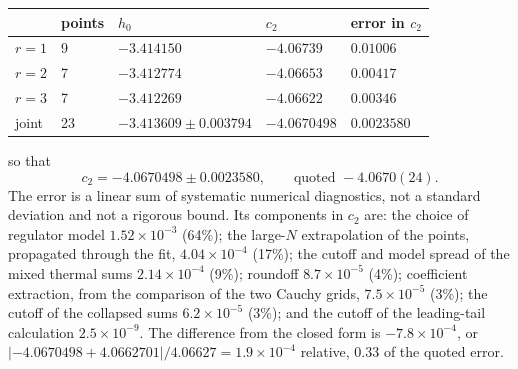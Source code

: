\documentclass[11pt,a4paper]{article}
\numberwithin{equation}{section}
\newcommand{\sci}[2]{#1\times10^{#2}}
\begin{document}
\begin{center}\small
\begin{tabular}{@{}lllll@{}}
\toprule
& points & $h_0$ & $c_2$ & error in $c_2$\\
\midrule
$r=1$ & 9 & $-3.414150$ & $-4.06739$ & $0.01006$\\
$r=2$ & 7 & $-3.412774$ & $-4.06653$ & $0.00417$\\
$r=3$ & 7 & $-3.412269$ & $-4.06622$ & $0.00346$\\
joint & 23 & $-3.413609\pm0.003794$ & $-4.0670498$ & $0.0023580$\\
\bottomrule
\end{tabular}
\end{center}
so that
\begin{equation}
 c_2=-4.0670498\pm0.0023580,\qquad\text{quoted }-4.0670(24).
\end{equation}
The error is a linear sum of systematic numerical diagnostics, not a standard deviation and not a rigorous bound.
Its components in $c_2$ are: the choice of regulator model $\sci{1.52}{-3}$ (64\%); the large-$N$ extrapolation of the
points, propagated through the fit, $\sci{4.04}{-4}$ (17\%); the cutoff and model spread of the mixed thermal sums
$\sci{2.14}{-4}$ (9\%); roundoff $\sci{8.7}{-5}$ (4\%); coefficient extraction, from the comparison of the two Cauchy
grids, $\sci{7.5}{-5}$ (3\%); the cutoff of the collapsed sums $\sci{6.2}{-5}$ (3\%); and the cutoff of the
leading-tail calculation $\sci{2.5}{-9}$. The difference from the closed form is $-\sci{7.8}{-4}$, or
$|{-4.0670498}+4.0662701|/4.06627=\sci{1.9}{-4}$ relative, 0.33 of the quoted error.
\end{document}
